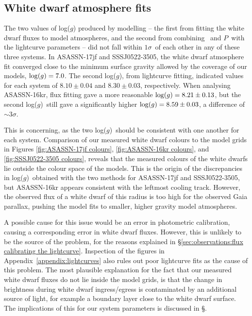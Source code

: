 \subsection{White dwarf atmosphere fits}
\label{sect:method WD atmosphere fits}

The two values of log($g$) produced by modelling -- the first from fitting the white dwarf fluxes to model atmospheres, and the second from combining \teff\ and $P$\ with the lightcurve parameters -- did not fall within $1\sigma$\ of each other in any of these three systems.
In ASASSN-17jf and SSSJ0522-3505, the white dwarf atmosphere fit converged close to the minimum surface gravity allowed by the coverage of our models, ${\rm log}(g) = 7.0$.
The second log($g$), from lightcurve fitting, indicated values for each system of $8.10\pm0.04$ and $8.30\pm0.03$, respectively.
When analysing ASASSN-16kr, flux fitting gave a more reasonable ${\rm log}(g)=8.21\pm0.13$, but the second log($g$)\ still gave a significantly higher ${\rm log}(g)=8.59\pm0.03$, a difference of $\sim3\sigma$.

This is concerning, as the two log($g$)\ should be consistent with one another for each system.
Comparison of our measured white dwarf colours to the \citet{Bergeron1995} model grids in Figures \ref{fig:ASASSN-17jf colours}, \ref{fig:ASASSN-16kr colours}, and \ref{fig:SSSJ0522-3505 colours}, reveals that the measured colours of the white dwarfs lie outside the colour space of the models. This is the origin of the discrepancies in log($g$)\ obtained with the two methods for ASASSN-17jf and SSSJ0522-3505, but ASASSN-16kr appears consistent with the leftmost cooling track. However, the observed flux of a white dwarf of this radius is too high for the observed Gaia parallax, pushing the model fits to smaller, higher gravity model atmospheres.

A possible cause for this issue would be an error in photometric calibration, causing a corresponding error in white dwarf fluxes. However, this is unlikely to be the source of the problem, for the reasons explained in \S\ref{sec:observations:flux calibrating the lightcurve}.
Inspection of the figures in Appendix~\ref{appendix:lightcurves} also rules out poor lightcurve fits as the cause of this problem. The most plausible explanation for the fact that our measured white dwarf fluxes do not lie inside the model grids, is that the change in brightness during white dwarf ingress/egress is contaminated by an additional source of light, for example a boundary layer close to the white dwarf surface. The implications of this for our system parameters is discussed in \S{}.

